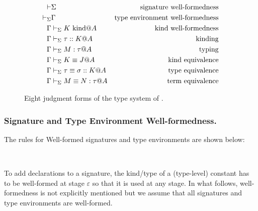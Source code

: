 \begin{figure}[tbp]
    \begin{center}
    \begin{align*}
      \vdash & \Sigma                     & \text{signature well-formedness}        \\
      \vdash_\Sigma     & \Gamma                         & \text{type environment well-formedness} \\
      \Gamma     & \vdash_\Sigma K \text{\ kind} @ A           & \text{kind well-formedness}             \\
      \Gamma     & \vdash_\Sigma \tau :: K @ A           & \text{kinding}                          \\
      \Gamma     & \vdash_\Sigma M : \tau @ A            & \text{typing}                           \\
      \Gamma     & \vdash_\Sigma K \equiv J @ A              & \text{kind equivalence}                 \\
      \Gamma     & \vdash_\Sigma \tau \equiv \sigma :: K @ A & \text{type equivalence}                 \\
      \Gamma     & \vdash_\Sigma M \equiv N : \tau @ A       & \text{term equivalence}
    \end{align*}
    \caption{Eight judgment forms of the type system of \LMD.}
    \label{fig:LMD-six-judgments}
  \end{center}
\end{figure}

\subsubsection{Signature and Type Environment Well-formedness.}
The rules for Well-formed signatures and type environments are
shown below:
%
{\small
\begin{center}
  \infrule{
  }{
    \vdash \emptyset
  }
  \hfil
  \hfil
  \\[2mm]
  \infrule{
  }{
    \V \emptyset
  }
  \hfil
\end{center}
}

To add declarations to a signature, the kind/type of a (type-level)
constant has to be well-formed at stage \(\varepsilon\) so that it is
used at any stage.  In what follows, well-formedness is not explicitly
mentioned but we assume that all signatures and type environments are
well-formed.

